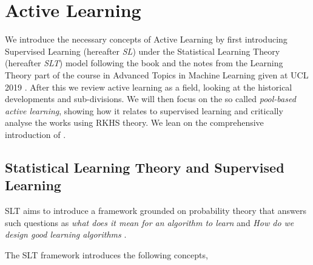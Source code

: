 \section{Active Learning} We introduce the necessary concepts of Active Learning
by first introducing Supervised Learning (hereafter \emph{SL}) under the
Statistical Learning Theory (hereafter \emph{SLT}) model following the book
\cite{shalev-shwartz14_under} and the notes from the Learning Theory part of the
course in Advanced Topics in Machine Learning given at UCL 2019
\cite{ciliberto18_advan_topic_machin_learn}. After this we review active
learning as a field, looking at the historical developments and sub-divisions.
We will then focus on the so called \emph{pool-based active learning}, showing
how it relates to supervised learning and critically analyse the works using
RKHS theory. We lean on the comprehensive introduction of
\cite{settles12_activ_learn}.

\subsection{Statistical Learning Theory and Supervised Learning} SLT aims to
introduce a framework grounded on probability theory that answers such questions
as \emph{what does it mean for an algorithm to learn} and \emph{How do we design
good learning algorithms} \cite[Lecture
1]{ciliberto18_advan_topic_machin_learn}.

The SLT framework introduces the following concepts,

